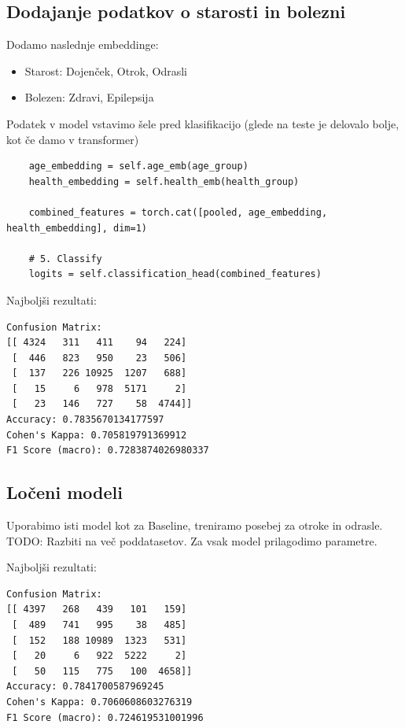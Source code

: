 \subsection{Dodajanje podatkov o starosti in bolezni}
Dodamo naslednje embeddinge:

\begin{itemize}
    \item Starost: Dojenček, Otrok, Odrasli
    \item Bolezen: Zdravi, Epilepsija
\end{itemize}
Podatek v model vstavimo šele pred klasifikacijo (glede na teste je delovalo bolje, kot če damo v transformer)
\begin{verbatim}
    age_embedding = self.age_emb(age_group)
    health_embedding = self.health_emb(health_group)

    combined_features = torch.cat([pooled, age_embedding, health_embedding], dim=1)

    # 5. Classify
    logits = self.classification_head(combined_features)
\end{verbatim}
Najboljši rezultati:
\begin{verbatim}
Confusion Matrix:
[[ 4324   311   411    94   224]
 [  446   823   950    23   506]
 [  137   226 10925  1207   688]
 [   15     6   978  5171     2]
 [   23   146   727    58  4744]]
Accuracy: 0.7835670134177597
Cohen's Kappa: 0.705819791369912
F1 Score (macro): 0.7283874026980337
\end{verbatim}

\subsection{Ločeni modeli}
Uporabimo isti model kot za Baseline, treniramo posebej 
za otroke in odrasle. TODO: Razbiti na več poddatasetov.
Za vsak model prilagodimo parametre.

Najboljši rezultati:
\begin{verbatim}
Confusion Matrix:
[[ 4397   268   439   101   159]
 [  489   741   995    38   485]
 [  152   188 10989  1323   531]
 [   20     6   922  5222     2]
 [   50   115   775   100  4658]]
Accuracy: 0.7841700587969245
Cohen's Kappa: 0.7060608603276319
F1 Score (macro): 0.724619531001996
\end{verbatim}